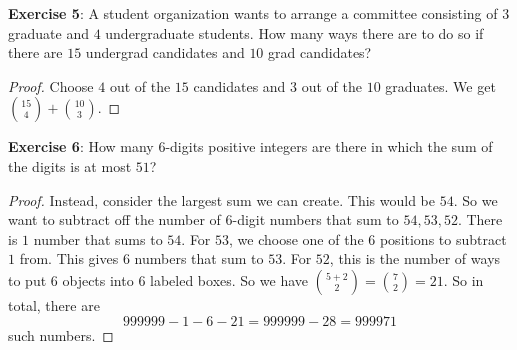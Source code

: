\documentclass{article}
\begin{document}
\textbf{Exercise 5}: A student organization wants to arrange a committee consisting of $3$ graduate and $4$ undergraduate students. How many ways there are to do so if there are $15$ undergrad candidates and $10$ grad candidates?
    \begin{proof}
        Choose $4$ out of the $15$ candidates and $3$ out of the $10$ graduates. We get $\binom{15}{4} + \binom{10}{3}$.
    \end{proof}

\textbf{Exercise 6}: How many $6$-digits positive integers are there in which the sum of the digits is at most $51$?
    \begin{proof}
        Instead, consider the largest sum we can create. This would be $54$. So we want to subtract off the number of $6$-digit numbers that sum to $54, 53, 52$. There is $1$ number that sums to $54$. For $53$, we choose one of the $6$ positions to subtract $1$ from. This gives $6$ numbers that sum to $53$. For $52$, this is the number of ways to put $6$ objects into $6$ labeled boxes. So we have $\binom{5 + 2}{2} = \binom{7}{2} = 21$. So in total, there are 
            \begin{equation*}
                999999 - 1 - 6 - 21 = 999999 - 28 = 999971
            \end{equation*}
        such numbers.
    \end{proof}
\end{document}
